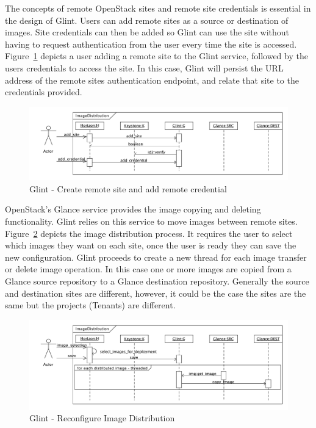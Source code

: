 \documentclass[a4paper]{jpconf}
\begin{document}
The concepts of remote OpenStack sites and remote site credentials is essential in the design of Glint. Users can add remote sites as a source or destination of images. Site credentials can then be added so Glint can use the site without having to request authentication from the user every time the site is accessed. Figure~\ref{fig:glintsitecred} depicts a user adding a remote site to the Glint service, followed by the users credentials to access the site. In this case, Glint will persist the URL address of the remote sites authentication endpoint, and relate that site to the credentials provided. 

\begin{figure}[H]
\begin{center}
\includegraphics[width=36pc]{images/glintsitecred.pdf}
\caption{\label{fig:glintsitecred}Glint - Create remote site and add remote credential}
\end{center}
\end{figure}

OpenStack's Glance service provides the image copying and deleting functionality. Glint relies on this service to move images between remote sites. Figure~\ref{fig:glintdist} depicts the image distribution process. It requires the user to select which images they want on each site, once the user is ready they can save the new configuration. Glint proceeds to create a new thread for each image transfer or delete image operation. In this case one or more images are copied from a Glance source repository to a Glance destination repository. Generally the source and destination sites are different, however, it could be the case the sites are the same but the projects (Tenants) are different.

\begin{figure}[H]
\begin{center}
\includegraphics[width=36pc]{images/glintdist.pdf}
\caption{\label{fig:glintdist}Glint - Reconfigure Image Distribution}
\end{center}
\end{figure}
\end{document}
